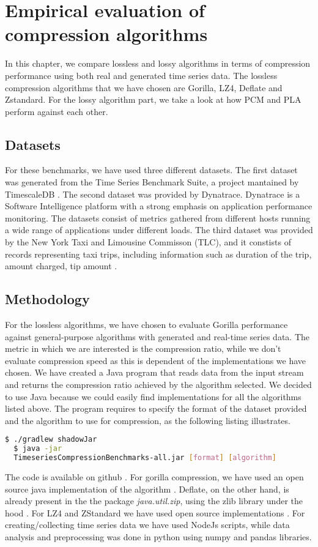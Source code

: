 \chapter{Empirical evaluation of compression algorithms}
In this chapter, we compare lossless and lossy algorithms in terms of compression performance using both real and 
generated time series data. The lossless compression algorithms that we have chosen are Gorilla, LZ4,
Deflate and Zstandard. For the lossy algorithm part, we take a look at how PCM and PLA perform against each other.

\section{Datasets}
For these benchmarks, we have used three different datasets. The first dataset was generated from the
Time Series Benchmark Suite, a project mantained by TimescaleDB \cite{timescale_2019_timescaletsbs}.
The second dataset was provided by Dynatrace. Dynatrace is a Software Intelligence platform with a strong
emphasis on application performance monitoring. The datasets consist of metrics gathered from
different hosts running a wide range of applications under different loads.
The third dataset was provided by the New York Taxi and Limousine Commisson (TLC), and it constists
of records representing taxi trips, including information such as duration of the trip, amount
charged, tip amount \cite{tlc2019_dataset}.

\section{Methodology}
For the lossless algorithms, we have chosen to evaluate Gorilla performance against general-purpose
algorithms with generated and real-time series data. The metric in which we are interested is the
compression ratio, while we don't evaluate compression speed as this is dependent of the implementations we have
chosen. We have created a Java program that reads data from the input stream and returns the compression ratio
achieved by the algorithm selected. We decided to use Java because we could easily find implementations for
all the algorithms listed above. The program requires to specify the format of the dataset provided and the
algorithm to use for compression, as the following listing illustrates.
\lstset{
    basicstyle=\small,
    stringstyle=\ttfamily
}
\begin{lstlisting}[language=bash]
  $ ./gradlew shadowJar
  $ java -jar
  TimeseriesCompressionBenchmarks-all.jar [format] [algorithm]
\end{lstlisting}
The code is available on github \cite{dovidio_2019_dovidiotscompressionthesis}.
For gorilla compression, we have used an open source java implementation of the algorithm
\cite{burmanm_2018_burmanmgorillatsc}. Deflate, on the other hand, is already present in the the package
\textit{java.util.zip}, using the zlib library under the hood \cite{a2019_deflater}.
For LZ4 and ZStandard we have used open source implementations \cite{lz4_2019_lz4lz4java}\cite{luben_2015_lubenzstdjni}.
For creating/collecting time series data we have used NodeJs scripts, while data analysis and preprocessing
was done in python using numpy and pandas libraries.

